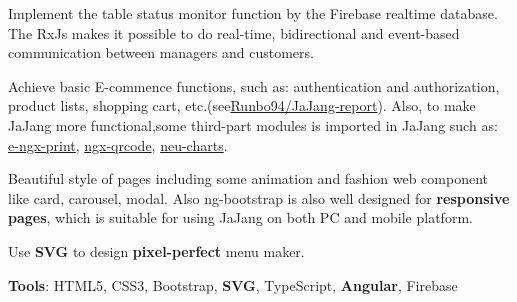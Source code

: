 \documentclass[letterpaper]{deedy-resume} %
\begin{document}
\begin{minipage}[t]{0.33\textwidth} %


\end{minipage} %
\begin{minipage}[t]{1\textwidth} %


\begin{tightitemize}
	\item Implement the table status monitor function by the Firebase realtime database. The RxJs makes it possible to do real-time, bidirectional and event-based communication between managers and customers.
	\item Achieve basic E-commence functions, such as: authentication and authorization, product lists, shopping cart, etc.(see\href{https://github.com/Runbo94/JaJang-report}{Runbo94/JaJang-report}). Also, to make JaJang more functional,some third-part modules is imported in JaJang such as: \href{https://github.com/laixiangran/e-ngx-print}{e-ngx-print}, \href{https://github.com/nacardin/ngx-qrcode}{ngx-qrcode},
	\href{https://www.npmjs.com/package/neu-charts}{neu-charts}.
	\item  Beautiful style of pages including some animation and fashion web component like card, carousel, modal. Also ng-bootstrap is also well designed for \textbf{responsive pages}, which is suitable for using JaJang on both PC and mobile platform.
	\item Use \textbf{SVG} to design \textbf{pixel-perfect} menu maker.
	\item \textbf{Tools}: HTML5, CSS3, Bootstrap, \textbf{SVG}, TypeScript, \textbf{Angular}, Firebase
\end{tightitemize}
\sectionspace %


\end{minipage}
\end{document}
